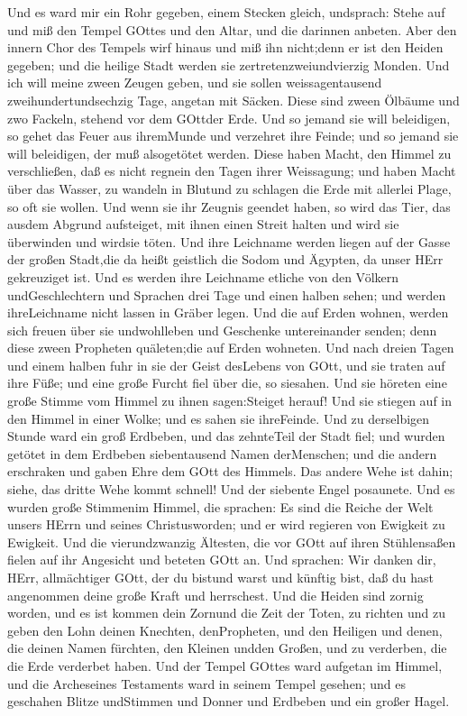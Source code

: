  Und es ward mir ein Rohr gegeben, einem Stecken gleich,
undsprach: Stehe auf und miß den Tempel GOttes und den Altar, und die
darinnen anbeten.  Aber den innern Chor des Tempels wirf
hinaus und miß ihn nicht;denn er ist den Heiden gegeben; und die heilige
Stadt werden sie zertretenzweiundvierzig Monden.  Und ich
will meine zween Zeugen geben, und sie sollen weissagentausend
zweihundertundsechzig Tage, angetan mit Säcken.  Diese sind
zween Ölbäume und zwo Fackeln, stehend vor dem GOttder Erde.
 Und so jemand sie will beleidigen, so gehet das Feuer aus
ihremMunde und verzehret ihre Feinde; und so jemand sie will beleidigen,
der muß alsogetötet werden.  Diese haben Macht, den Himmel
zu verschließen, daß es nicht regnein den Tagen ihrer Weissagung; und
haben Macht über das Wasser, zu wandeln in Blutund zu schlagen die Erde
mit allerlei Plage, so oft sie wollen.  Und wenn sie ihr
Zeugnis geendet haben, so wird das Tier, das ausdem Abgrund aufsteiget,
mit ihnen einen Streit halten und wird sie überwinden und wirdsie töten.
 Und ihre Leichname werden liegen auf der Gasse der großen
Stadt,die da heißt geistlich die Sodom und Ägypten, da unser HErr
gekreuziget ist.  Und es werden ihre Leichname etliche von
den Völkern undGeschlechtern und Sprachen drei Tage und einen halben
sehen; und werden ihreLeichname nicht lassen in Gräber legen.
 Und die auf Erden wohnen, werden sich freuen über sie
undwohlleben und Geschenke untereinander senden; denn diese zween
Propheten quäleten;die auf Erden wohneten.  Und nach dreien
Tagen und einem halben fuhr in sie der Geist desLebens von GOtt, und sie
traten auf ihre Füße; und eine große Furcht fiel über die, so siesahen.
 Und sie höreten eine große Stimme vom Himmel zu ihnen
sagen:Steiget herauf! Und sie stiegen auf in den Himmel in einer Wolke;
und es sahen sie ihreFeinde.  Und zu derselbigen Stunde
ward ein groß Erdbeben, und das zehnteTeil der Stadt fiel; und wurden
getötet in dem Erdbeben siebentausend Namen derMenschen; und die andern
erschraken und gaben Ehre dem GOtt des Himmels.  Das andere
Wehe ist dahin; siehe, das dritte Wehe kommt schnell!  Und
der siebente Engel posaunete. Und es wurden große Stimmenim Himmel, die
sprachen: Es sind die Reiche der Welt unsers HErrn und seines
Christusworden; und er wird regieren von Ewigkeit zu Ewigkeit.
 Und die vierundzwanzig Ältesten, die vor GOtt auf ihren
Stühlensaßen fielen auf ihr Angesicht und beteten GOtt an. 
Und sprachen: Wir danken dir, HErr, allmächtiger GOtt, der du bistund
warst und künftig bist, daß du hast angenommen deine große Kraft und
herrschest.  Und die Heiden sind zornig worden, und es ist
kommen dein Zornund die Zeit der Toten, zu richten und zu geben den Lohn
deinen Knechten, denPropheten, und den Heiligen und denen, die deinen
Namen fürchten, den Kleinen undden Großen, und zu verderben, die die
Erde verderbet haben.  Und der Tempel GOttes ward aufgetan
im Himmel, und die Archeseines Testaments ward in seinem Tempel gesehen;
und es geschahen Blitze undStimmen und Donner und Erdbeben und ein
großer Hagel.

